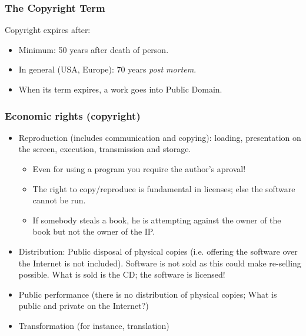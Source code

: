 
\begin{frame}
\frametitle{The Copyright Term}

Copyright expires after:

\begin{itemize}
\item Minimum: 50 years after death of person. 
\item In general (USA, Europe): 70 years \textit{post mortem}.
\item When its term expires, a work goes into Public Domain.

\end{itemize}

\end{frame}


\begin{frame}
\frametitle{Economic rights (copyright)}

\begin{itemize}
\item Reproduction (includes communication and copying): loading,
presentation on the screen, execution, transmission and storage.
\begin{itemize}
\item Even for using a program you require the author's aproval!
\item The right to copy/reproduce is fundamental in licenses; else
the software cannot be run.
\item If somebody steals a book, he is attempting against the owner
of the book but not the owner of the IP. 
\end{itemize}
\item Distribution: Public disposal of physical copies (i.e. offering
the software over the Internet is not included). Software is not
sold as this could make re-selling possible. What is sold is the CD; the
software is licensed!
\item Public performance (there is no distribution of physical copies; What is public and private
on the Internet?)
\item Transformation (for instance, translation)
\end{itemize}


\end{frame}




